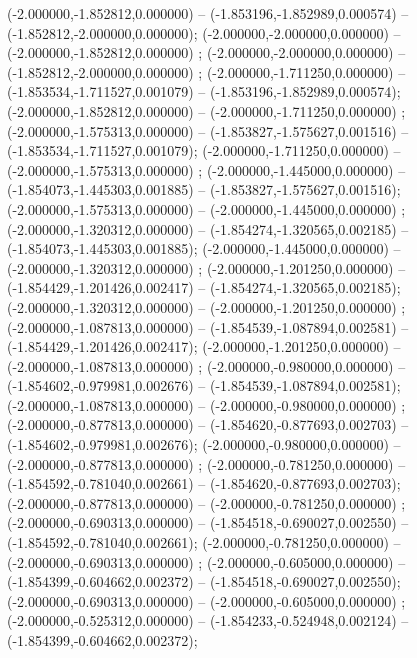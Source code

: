  (-2.000000,-1.852812,0.000000) -- (-1.853196,-1.852989,0.000574) -- (-1.852812,-2.000000,0.000000);
 (-2.000000,-2.000000,0.000000) -- (-2.000000,-1.852812,0.000000) ;
 (-2.000000,-2.000000,0.000000) -- (-1.852812,-2.000000,0.000000) ;
 (-2.000000,-1.711250,0.000000) -- (-1.853534,-1.711527,0.001079) -- (-1.853196,-1.852989,0.000574);
 (-2.000000,-1.852812,0.000000) -- (-2.000000,-1.711250,0.000000) ;
 (-2.000000,-1.575313,0.000000) -- (-1.853827,-1.575627,0.001516) -- (-1.853534,-1.711527,0.001079);
 (-2.000000,-1.711250,0.000000) -- (-2.000000,-1.575313,0.000000) ;
 (-2.000000,-1.445000,0.000000) -- (-1.854073,-1.445303,0.001885) -- (-1.853827,-1.575627,0.001516);
 (-2.000000,-1.575313,0.000000) -- (-2.000000,-1.445000,0.000000) ;
 (-2.000000,-1.320312,0.000000) -- (-1.854274,-1.320565,0.002185) -- (-1.854073,-1.445303,0.001885);
 (-2.000000,-1.445000,0.000000) -- (-2.000000,-1.320312,0.000000) ;
 (-2.000000,-1.201250,0.000000) -- (-1.854429,-1.201426,0.002417) -- (-1.854274,-1.320565,0.002185);
 (-2.000000,-1.320312,0.000000) -- (-2.000000,-1.201250,0.000000) ;
 (-2.000000,-1.087813,0.000000) -- (-1.854539,-1.087894,0.002581) -- (-1.854429,-1.201426,0.002417);
 (-2.000000,-1.201250,0.000000) -- (-2.000000,-1.087813,0.000000) ;
 (-2.000000,-0.980000,0.000000) -- (-1.854602,-0.979981,0.002676) -- (-1.854539,-1.087894,0.002581);
 (-2.000000,-1.087813,0.000000) -- (-2.000000,-0.980000,0.000000) ;
 (-2.000000,-0.877813,0.000000) -- (-1.854620,-0.877693,0.002703) -- (-1.854602,-0.979981,0.002676);
 (-2.000000,-0.980000,0.000000) -- (-2.000000,-0.877813,0.000000) ;
 (-2.000000,-0.781250,0.000000) -- (-1.854592,-0.781040,0.002661) -- (-1.854620,-0.877693,0.002703);
 (-2.000000,-0.877813,0.000000) -- (-2.000000,-0.781250,0.000000) ;
 (-2.000000,-0.690313,0.000000) -- (-1.854518,-0.690027,0.002550) -- (-1.854592,-0.781040,0.002661);
 (-2.000000,-0.781250,0.000000) -- (-2.000000,-0.690313,0.000000) ;
 (-2.000000,-0.605000,0.000000) -- (-1.854399,-0.604662,0.002372) -- (-1.854518,-0.690027,0.002550);
 (-2.000000,-0.690313,0.000000) -- (-2.000000,-0.605000,0.000000) ;
 (-2.000000,-0.525312,0.000000) -- (-1.854233,-0.524948,0.002124) -- (-1.854399,-0.604662,0.002372);
